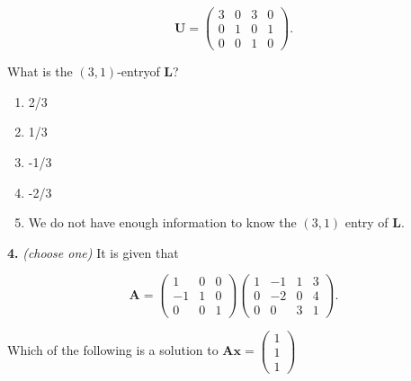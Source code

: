 \documentclass[10pt,a4paper]{article}
\begin{document}
\[\mathbf{U}=\begin{pmatrix}      3   &  0   &  3  &   0\\      0   &  1   &  0  &   1\\      0   &  0   &  1  &   0 \end{pmatrix}.\]

What is the \((3,1)\)-entryof \(\mathbf{L}\)?

\begin{enumerate}[label=(\Alph*)]
\item 2/3
\item 1/3
\item -1/3
\item -2/3
\item We do not have enough information to know the \((3,1)\) entry of \(\mathbf{L}\).
\end{enumerate}
\smallskip
\textbf{4.} \textit{(choose one)} It is given that

\[\mathbf{A}=\begin{pmatrix}      1   &  0   &  0\\     -1  &   1  &   0\\      0  &   0  &   1 \end{pmatrix}\begin{pmatrix}      1  &  -1 &    1   &  3\\      0 &   -2 &    0   &  4\\      0  &   0 &    3   &  1 \end{pmatrix}.\]

Which of the following is a solution to \(\mathbf{Ax}=\begin{pmatrix}1\\1\\1\end{pmatrix}\)
\end{document}
